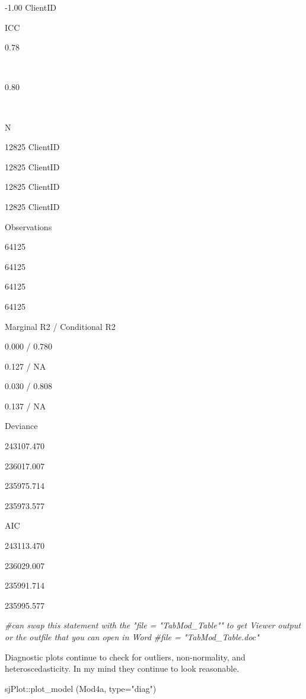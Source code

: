 \documentclass[
  english,
]{book}
\newenvironment{Shaded}{\begin{snugshade}}{\end{snugshade}}
\newcommand{\AttributeTok}[1]{\textcolor[rgb]{0.77,0.63,0.00}{#1}}
\newcommand{\CommentTok}[1]{\textcolor[rgb]{0.56,0.35,0.01}{\textit{#1}}}
\newcommand{\FunctionTok}[1]{\textcolor[rgb]{0.00,0.00,0.00}{#1}}
\newcommand{\NormalTok}[1]{#1}
\newcommand{\SpecialCharTok}[1]{\textcolor[rgb]{0.00,0.00,0.00}{#1}}
\newcommand{\StringTok}[1]{\textcolor[rgb]{0.31,0.60,0.02}{#1}}
\begin{document}
-1.00 ClientID

ICC

0.78

~

0.80

~

N

12825 ClientID

12825 ClientID

12825 ClientID

12825 ClientID

Observations

64125

64125

64125

64125

Marginal R2 / Conditional R2

0.000 / 0.780

0.127 / NA

0.030 / 0.808

0.137 / NA

Deviance

243107.470

236017.007

235975.714

235973.577

AIC

243113.470

236029.007

235991.714

235995.577

\begin{Shaded}
\begin{Highlighting}[]
\CommentTok{\#can swap this statement with the "file = "TabMod\_Table"" to get Viewer output or the outfile that you can open in Word}
\CommentTok{\#file = "TabMod\_Table.doc"}
\end{Highlighting}
\end{Shaded}

Diagnostic plots continue to check for outliers, non-normality, and heteroscedasticity. In my mind they continue to look reasonable.

\begin{Shaded}
\begin{Highlighting}[]
\NormalTok{sjPlot}\SpecialCharTok{::}\FunctionTok{plot\_model}\NormalTok{ (Mod4a, }\AttributeTok{type=}\StringTok{"diag"}\NormalTok{)}
\end{Highlighting}
\end{Shaded}
\end{document}
